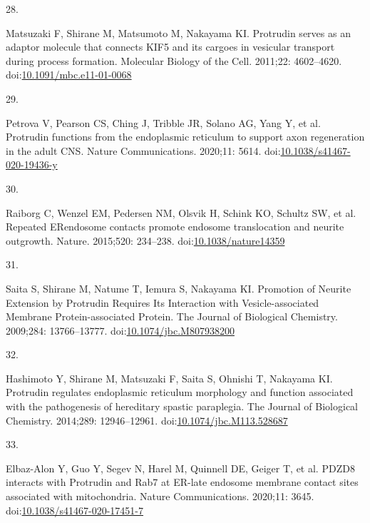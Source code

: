 \documentclass[
  12pt,
  a4paper,
]{article}
\newlength{\cslhangindent}
\newlength{\csllabelwidth}
\newlength{\cslentryspacingunit} %
\newenvironment{CSLReferences}[2] %
 {%
  \setlength{\parindent}{0pt}
  \ifodd #1
  \let\oldpar\par
  \def\par{\hangindent=\cslhangindent\oldpar}
  \fi
  \setlength{\parskip}{#2\cslentryspacingunit}
 }%
 {}
\newcommand{\CSLLeftMargin}[1]{\parbox[t]{\csllabelwidth}{#1}}
\newcommand{\CSLRightInline}[1]{\parbox[t]{\linewidth - \csllabelwidth}{#1}\break}
\begin{document}
\begin{CSLReferences}{0}{0}
\leavevmode{}%
\CSLLeftMargin{28. }%
\CSLRightInline{Matsuzaki F, Shirane M, Matsumoto M, Nakayama KI.
Protrudin serves as an adaptor molecule that connects {KIF5} and its
cargoes in vesicular transport during process formation. Molecular
Biology of the Cell. 2011;22: 4602--4620.
doi:\href{https://doi.org/10.1091/mbc.e11-01-0068}{10.1091/mbc.e11-01-0068}}

\leavevmode{}%
\CSLLeftMargin{29. }%
\CSLRightInline{Petrova V, Pearson CS, Ching J, Tribble JR, Solano AG,
Yang Y, et al. Protrudin functions from the endoplasmic reticulum to
support axon regeneration in the adult {CNS}. Nature Communications.
2020;11: 5614.
doi:\href{https://doi.org/10.1038/s41467-020-19436-y}{10.1038/s41467-020-19436-y}}

\leavevmode{}%
\CSLLeftMargin{30. }%
\CSLRightInline{Raiborg C, Wenzel EM, Pedersen NM, Olsvik H, Schink KO,
Schultz SW, et al. Repeated {ER}\textendash endosome contacts promote
endosome translocation and neurite outgrowth. Nature. 2015;520:
234--238.
doi:\href{https://doi.org/10.1038/nature14359}{10.1038/nature14359}}

\leavevmode{}%
\CSLLeftMargin{31. }%
\CSLRightInline{Saita S, Shirane M, Natume T, Iemura S, Nakayama KI.
Promotion of {Neurite Extension} by {Protrudin Requires Its Interaction}
with {Vesicle-associated Membrane Protein-associated Protein}. The
Journal of Biological Chemistry. 2009;284: 13766--13777.
doi:\href{https://doi.org/10.1074/jbc.M807938200}{10.1074/jbc.M807938200}}

\leavevmode{}%
\CSLLeftMargin{32. }%
\CSLRightInline{Hashimoto Y, Shirane M, Matsuzaki F, Saita S, Ohnishi T,
Nakayama KI. Protrudin regulates endoplasmic reticulum morphology and
function associated with the pathogenesis of hereditary spastic
paraplegia. The Journal of Biological Chemistry. 2014;289: 12946--12961.
doi:\href{https://doi.org/10.1074/jbc.M113.528687}{10.1074/jbc.M113.528687}}

\leavevmode{}%
\CSLLeftMargin{33. }%
\CSLRightInline{Elbaz-Alon Y, Guo Y, Segev N, Harel M, Quinnell DE,
Geiger T, et al. {PDZD8} interacts with {Protrudin} and {Rab7} at
{ER-late} endosome membrane contact sites associated with mitochondria.
Nature Communications. 2020;11: 3645.
doi:\href{https://doi.org/10.1038/s41467-020-17451-7}{10.1038/s41467-020-17451-7}}


\end{CSLReferences}
\end{document}
